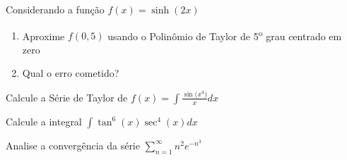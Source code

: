 \documentclass[a4paper,12pt,fleqn]{article}
\begin{document}

\vspace{\baselineskip}
Considerando a função \(f(x) = \sinh(2x)\)
\begin{enumerate}[label=\alph*)]
  \item Aproxime \(f(0,5)\) usando o Polinômio
        de Taylor de 5\textsuperscript{o} grau centrado em zero
  \item Qual o erro cometido?
\end{enumerate}

\begin{answer}
\end{answer}

\vspace{\baselineskip}
Calcule a Série de Taylor de \(f(x) = \int\frac{\sin\big(x^4\big)}{x}dx\)

\begin{answer}
\end{answer}

\vspace{\baselineskip}
Calcule a integral \(\int \tan^6(x)\sec^4(x)dx\)

\begin{answer}
\end{answer}

\vspace{\baselineskip}
Analise a convergência da série
\(
  \sum_{n=1}^\infty n^2e^{-n^3}
\)

\begin{answer}
\end{answer}

\end{document}

